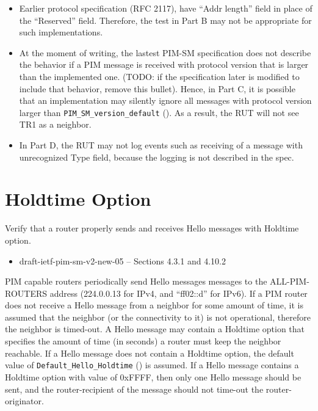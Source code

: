 \documentclass[11pt]{report}
\begin{document}
\begin{itemize}

  \item Earlier protocol specification (RFC 2117), have ``Addr length''
        field in place of the ``Reserved'' field. Therefore, the test in Part
        B may not be appropriate for such implementations.

  \item At the moment of writing, the lastest
        PIM-SM specification does not describe the behavior if a PIM message is
        received with protocol version that is larger than the implemented
        one.
        (TODO: if the specification later is modified to include that behavior,
        remove this bullet).
        Hence, in Part C, it is possible that an implementation may
        silently ignore all messages with protocol version larger than
        \verb=PIM_SM_version_default= ({\PimsmVersionDefault}).
        As a result, the RUT will not see TR1 as a neighbor.

  \item In Part D, the RUT may not log events such as receiving of a message
        with unrecognized Type field, because the logging is not described
        in the spec.

\end{itemize}

\newpage
\section{Holdtime Option}

Verify that a router properly sends and receives Hello messages with Holdtime
option.

\begin{itemize}
  \item draft-ietf-pim-sm-v2-new-05 -- Sections 4.3.1 and 4.10.2
\end{itemize}

PIM capable routers periodically send Hello messages
messages to the ALL-PIM-ROUTERS address (224.0.0.13 for IPv4,
and ``ff02::d'' for IPv6). If a PIM router does not receive a Hello message
from a neighbor for some amount of time, it is assumed that the neighbor (or
the connectivity to it) is not operational, therefore the neighbor is
timed-out. A Hello message may contain a Holdtime option that specifies the
amount of time (in seconds) a router must keep the neighbor reachable.
If a Hello message does not contain a Holdtime option, the default value
of \verb=Default_Hello_Holdtime= ({\PimsmDefaultHelloHoldtime})
is assumed. If a Hello message contains a Holdtime option with value of
0xFFFF, then only one Hello message should be sent, and the router-recipient
of the message should not time-out the router-originator.
\end{document}
